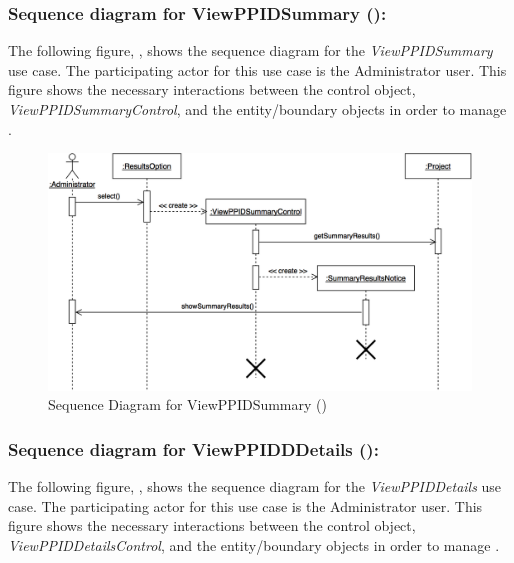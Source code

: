 \documentclass[12pt,letterpaper]{article}
\begin{document}
\newpage{}

\subsubsection*{Sequence diagram for ViewPPIDSummary ():}

The following figure, , shows the sequence diagram for the {\it ViewPPIDSummary} use case. The participating actor for this use case is
the Administrator user. This figure shows the necessary interactions between the control object, {\it ViewPPIDSummaryControl}, and the
entity/boundary objects in order to manage .

\begin{figure}[H]
	\centering{}
	\includegraphics[scale=0.25]{imgs/seq/view-ppid-summary.png}
	\caption[ - Sequence Diagram for ViewPPIDSummary]{Sequence Diagram for ViewPPIDSummary ()}
\end{figure}

\subsubsection*{Sequence diagram for ViewPPIDDDetails ():}

The following figure, , shows the sequence diagram for the {\it ViewPPIDDetails} use case. The participating actor for this use case is
the Administrator user. This figure shows the necessary interactions between the control object, {\it ViewPPIDDetailsControl}, and the
entity/boundary objects in order to manage .
\end{document}
